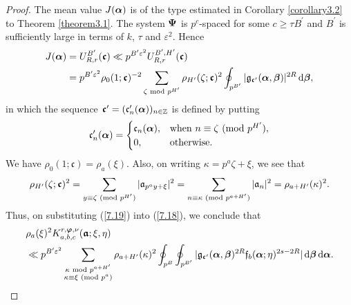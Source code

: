 \documentclass[12pt,reqno]{amsart}
\theoremstyle{definition}
\theoremstyle{remark}
\numberwithin{equation}{section}
\newcommand{\mmod}[1]{\,\,(\text{\rm mod}\,\,#1)}
\newcommand{\nmod}[1]{\,\,\text{\rm mod}\,\,#1}
\def\dbZ{{\mathbb Z}}\def\dbQ{{\mathbb Q}}
\def\gra{{\mathfrak a}}\def\grA{{\mathfrak A}}\def\bfgra{{\boldsymbol \gra}}
\def\grc{{\mathfrak c}}\def\grC{{\mathfrak C}}\def\bfgrc{{\boldsymbol \grc}}
\def\grf{{\mathfrak f}}\def\grF{{\mathfrak F}}
\def\grg{{\mathfrak g}}\def\grG{{\mathfrak G}}
\def\zet{{\zeta}} \def\bfzet{{\boldsymbol \zeta}} \def\zetbar{{\overline \zet}}
\def\kap{{\kappa}}
\def\eps{\varepsilon}
\def\d{{\,{\rm d}}}
\begin{document}
\begin{proof}
The mean value $J({\boldsymbol \alpha})$ is of the type estimated in Corollary \ref{corollary3.2} to 
Theorem \ref{theorem3.1}. The system ${\boldsymbol \Psi}$ is $p^c$-spaced for some 
$c\ge \tau B^\prime$ and $B^\prime$ is sufficiently large in terms of $k$, $\tau$ and 
$\eps^2$. Hence
\begin{align}
J(\bfalp)&=U_{R,r}^{B^\prime}(\bfgrc)\ll p^{B^\prime \eps^2}
U_{R,r}^{B^\prime,H^\prime}(\bfgrc)\notag \\
&=p^{B^\prime \eps^2}\rho_0(1;\bfgrc)^{-2}\sum_{\zet\nmod{p^{H^\prime}}}
\rho_{H^\prime}(\zet;\bfgrc)^2\oint_{p^{B^\prime}}|\grg_{\bfgrc^\prime}(\bfalp,
\bfbet)|^{2R}\d\bfbet ,\label{7.19}
\end{align}
in which the sequence $\bfgrc^\prime =(\grc^\prime_n(\bfalp))_{n\in \dbZ}$ is defined by 
putting
$$\grc^\prime_n(\bfalp)=\begin{cases} \grc_n(\bfalp),&\text{when 
$n\equiv \zet\mmod{p^{H^\prime}}$},\\
0,&\text{otherwise}.\end{cases}$$
We have $\rho_0(1;\bfgrc)=\rho_a(\xi)$. Also, on writing $\kap=p^a\zet+\xi$, we see that
$$\rho_{H^\prime}(\zet;\bfgrc)^2=\sum_{y\equiv \zet\mmod{p^{H^\prime}}}
|\gra_{p^ay+\xi}|^2=\sum_{n\equiv \kap\mmod{p^{a+H^\prime}}}|\gra_n|^2
=\rho_{a+H^\prime}(\kap)^2.$$
Thus, on substituting (\ref{7.19}) into (\ref{7.18}), we conclude that
\begin{align}
&\rho_a(\xi)^2K_{a,b,c}^{r,\bfvarphi,\nu}(\bfgra;\xi,\eta)\notag \\
&\ll p^{B^\prime \eps^2}\sum_{\substack{\kap\nmod{p^{a+H^\prime}}\\ 
\kap\equiv \xi\mmod{p^a}}}\rho_{a+H^\prime}(\kap)^2
\oint_{p^B}\oint_{p^{B^\prime}}|\grg_{\bfgrc^\prime}(\bfalp,\bfbet)^{2R}
\grf_b(\bfalp;\eta)^{2s-2R}|\d\bfbet \d\bfalp .\label{7.20}
\end{align}


\end{proof}
\end{document}
